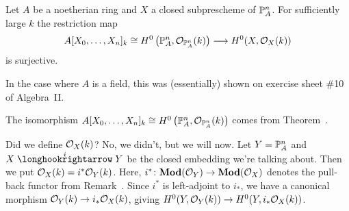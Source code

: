 \documentclass[a4paper,parskip=half,numbers=enddot, DIV=12]{scrreprt}
\begin{document}
\begin{prop}
	Let $A$ be a noetherian ring and $X$ a closed subprescheme of $\mathbb{P}_A^n$. For sufficiently large $k$ the restriction map
	\begin{align*}
		A[X_0,\ldots,X_n]_k\cong H^0\left(\IP_A^n,\Oo_{\IP_A^n}(k)\right)\morphism H^0(X,\Oo_X(k))
	\end{align*}
	is surjective.
\end{prop}
\begin{rem}
	\begin{alphanumerate}
		\item {}In the case where $A$ is a field, this was (essentially) shown on exercise sheet \#10 of Algebra~II.
		\item The isomorphism $A[X_0,\ldots,X_n]_k\cong H^0\left(\mathbb{P}_A^n,\mathcal{O}_{\mathbb{P}_A^n}(k)\right)$ comes from Theorem~.
		\item Did we define $\mathcal{O}_X(k)$? No, we didn't, but we will now. Let $Y=\mathbb{P}_A^n$ and $X\monomorphism[i]Y$ be the closed embedding we're talking about. Then we put $\mathcal{O}_X(k)=i^*\mathcal{O}_Y(k)$. Here, $i^*\colon \cat{Mod}(\Oo_Y)\morphism\cat{Mod}(\Oo_X)$ denotes the pull-back functor from Remark~. Since $i^*$ is left-adjoint to $i_*$, we have a canonical morphism $\Oo_Y(k)\morphism i_*\Oo_X(k)$, giving $H^0(Y,\Oo_Y(k))\morphism H^0(Y,i_*\Oo_X(k))$. 
		

\end{alphanumerate}
\end{rem}
\end{document}

